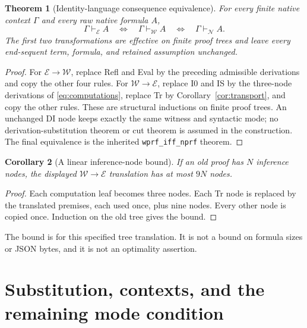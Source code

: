\documentclass[11pt]{article}
\newtheorem{theorem}{Theorem}[section]
\newtheorem{corollary}[theorem]{Corollary}
\theoremstyle{definition}
\newcommand{\E}{\mathcal E}
\newcommand{\W}{\mathcal W}
\newcommand{\N}{\mathcal N}
\begin{document}
\begin{theorem}[Identity-language consequence equivalence]
\label{thm:equivalence}
For every finite native context $\Gamma$ and every raw native formula $A$,
\[
 \Gamma\vdash_\E A
 \quad\Longleftrightarrow\quad
 \Gamma\vdash_\W A
 \quad\Longleftrightarrow\quad
 \Gamma\vdash_\N A.
\]
The first two transformations are effective on finite proof trees and
leave every end-sequent term, formula, and retained assumption unchanged.
\end{theorem}
\begin{proof}
For $\E\to\W$, replace Refl and Eval by the preceding admissible
derivations and copy the other four rules. For $\W\to\E$, replace
I0 and IS by the three-node derivations of
\eqref{eq:computations}, replace Tr by Corollary~\ref{cor:transport},
and copy the other rules. These are structural inductions on finite
proof trees. An unchanged DI node keeps exactly the same witness and
syntactic mode; no derivation-substitution theorem or cut theorem is
assumed in the construction. The final equivalence is the inherited
\texttt{wprf\_iff\_nprf} theorem.
\end{proof}

\begin{corollary}[A linear inference-node bound]
If an old proof has $N$ inference nodes, the displayed $\W\to\E$
translation has at most $9N$ nodes.
\end{corollary}
\begin{proof}
Each computation leaf becomes three nodes. Each Tr node is replaced by
the translated premises, each used once, plus nine nodes. Every other
node is copied once. Induction on the old tree gives the bound.
\end{proof}

The bound is for this specified tree translation. It is not a bound on
formula sizes or JSON bytes, and it is not an optimality assertion.

\section{Substitution, contexts, and the remaining mode condition}
\end{document}
